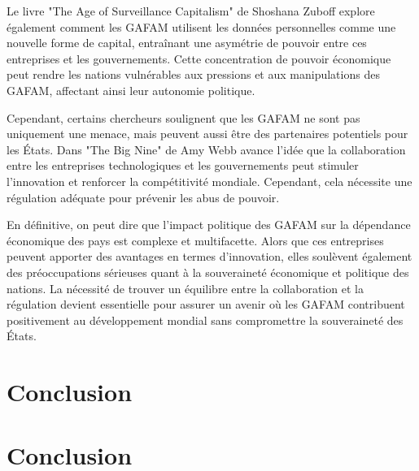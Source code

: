 \documentclass[12pt,a4paper]{article} %
\begin{document}
	 Le livre "The Age of Surveillance Capitalism" de Shoshana Zuboff \cite{Zuboff2020} explore également comment les GAFAM utilisent les données personnelles comme une nouvelle forme de capital, entraînant une asymétrie de pouvoir entre ces entreprises et les gouvernements. Cette concentration de pouvoir économique peut rendre les nations vulnérables aux pressions et aux manipulations des GAFAM, affectant ainsi leur autonomie politique.
	 
	 Cependant, certains chercheurs soulignent que les GAFAM ne sont pas uniquement une menace, mais peuvent aussi être des partenaires potentiels pour les États. Dans "The Big Nine" de Amy Webb \cite{Webb2019} avance l'idée que la collaboration entre les entreprises technologiques et les gouvernements peut stimuler l'innovation et renforcer la compétitivité mondiale. Cependant, cela nécessite une régulation adéquate pour prévenir les abus de pouvoir.
	 
	 En définitive, on peut dire que l'impact politique des GAFAM sur la dépendance économique des pays est complexe et multifacette. Alors que ces entreprises peuvent apporter des avantages en termes d'innovation, elles soulèvent également des préoccupations sérieuses quant à la souveraineté économique et politique des nations. La nécessité de trouver un équilibre entre la collaboration et la régulation devient essentielle pour assurer un avenir où les GAFAM contribuent positivement au développement mondial sans compromettre la souveraineté des États.
	 
	
	\section{Conclusion}
	\section{Conclusion}
	\printbibliography
	
\end{document}
